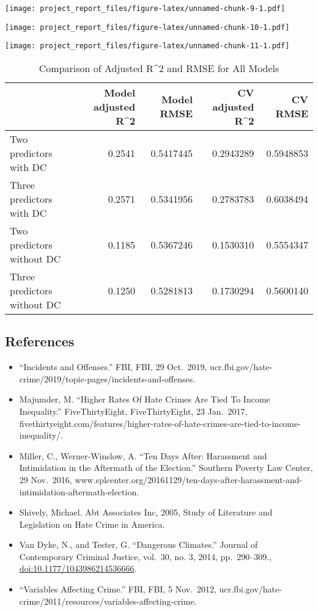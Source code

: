 \documentclass[
]{article}
\providecommand{\tightlist}{%
  \setlength{\itemsep}{0pt}\setlength{\parskip}{0pt}}
\begin{document}
\texttt{[image: project\_report\_files/figure-latex/unnamed-chunk-9-1.pdf]}

\texttt{[image: project\_report\_files/figure-latex/unnamed-chunk-10-1.pdf]}

\texttt{[image: project\_report\_files/figure-latex/unnamed-chunk-11-1.pdf]}

\begin{table}

\caption{\label{tab:unnamed-chunk-12}Comparison of Adjusted R^2 and RMSE for All Models}
\centering
\begin{tabular}[t]{l|r|r|r|r}
\hline
  & Model adjusted R\textasciicircum{}2 & Model RMSE & CV adjusted R\textasciicircum{}2 & CV RMSE\\
\hline
Two predictors with DC & 0.2541 & 0.5417445 & 0.2943289 & 0.5948853\\
\hline
Three predictors with DC & 0.2571 & 0.5341956 & 0.2783783 & 0.6038494\\
\hline
Two predictors without DC & 0.1185 & 0.5367246 & 0.1530310 & 0.5554347\\
\hline
Three predictors without DC & 0.1250 & 0.5281813 & 0.1730294 & 0.5600140\\
\hline
\end{tabular}
\end{table}

\hypertarget{references}{%
\subsection{References}\label{references}}

\begin{itemize}
\tightlist
\item
  ``Incidents and Offenses.'' FBI, FBI, 29 Oct.~2019,
  ucr.fbi.gov/hate-crime/2019/topic-pages/incidents-and-offenses.
\item
  Majumder, M. ``Higher Rates Of Hate Crimes Are Tied To Income
  Inequality.'' FiveThirtyEight, FiveThirtyEight, 23 Jan.~2017,
  fivethirtyeight.com/features/higher-rates-of-hate-crimes-are-tied-to-income-inequality/.
\item
  Miller, C., Werner-Winslow, A. ``Ten Days After: Harassment and
  Intimidation in the Aftermath of the Election.'' Southern Poverty Law
  Center, 29 Nov.~2016,
  www.splcenter.org/20161129/ten-days-after-harassment-and-intimidation-aftermath-election.\\
\item
  Shively, Michael. Abt Associates Inc, 2005, Study of Literature and
  Legislation on Hate Crime in America.
\item
  Van Dyke, N., and Tester, G. ``Dangerous Climates.'' Journal of
  Contemporary Criminal Justice, vol.~30, no. 3, 2014, pp.~290--309.,
  \url{doi:10.1177/1043986214536666}.
\item
  ``Variables Affecting Crime.'' FBI, FBI, 5 Nov.~2012,
  ucr.fbi.gov/hate-crime/2011/resources/variables-affecting-crime.
\end{itemize}
\end{document}
